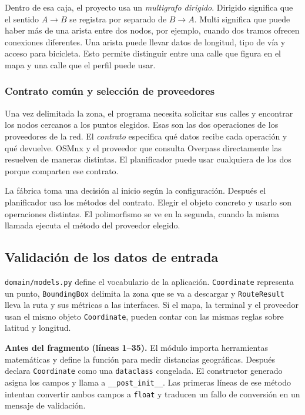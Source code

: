 \documentclass[11pt,a4paper]{article}
\begin{document}
Dentro de esa caja, el proyecto usa un \emph{multigrafo dirigido}. Dirigido significa que el sentido \(A\to B\) se registra por separado de \(B\to A\). Multi significa que puede haber más de una arista entre dos nodos, por ejemplo, cuando dos tramos ofrecen conexiones diferentes. Una arista puede llevar datos de longitud, tipo de vía y acceso para bicicleta. Esto permite distinguir entre una calle que figura en el mapa y una calle que el perfil puede usar.

\subsubsection{Contrato común y selección de proveedores}
Una vez delimitada la zona, el programa necesita solicitar sus calles y encontrar los nodos cercanos a los puntos elegidos. Esas son las dos operaciones de los proveedores de la red. El \emph{contrato} especifica qué datos recibe cada operación y qué devuelve. OSMnx y el proveedor que consulta Overpass directamente las resuelven de maneras distintas. El planificador puede usar cualquiera de los dos porque comparten ese contrato.

La fábrica toma una decisión al inicio según la configuración. Después el planificador usa los métodos del contrato. Elegir el objeto concreto y usarlo son operaciones distintas. El polimorfismo se ve en la segunda, cuando la misma llamada ejecuta el método del proveedor elegido.

\subsection{Validación de los datos de entrada}

\texttt{domain/models.py} define el vocabulario de la aplicación. \texttt{Coordinate} representa un punto, \texttt{BoundingBox} delimita la zona que se va a descargar y \texttt{RouteResult} lleva la ruta y sus métricas a las interfaces. Si el mapa, la terminal y el proveedor usan el mismo objeto \texttt{Coordinate}, pueden contar con las mismas reglas sobre latitud y longitud.

\textbf{Antes del fragmento (líneas 1--35).} El módulo importa herramientas matemáticas y define la función para medir distancias geográficas. Después declara \texttt{Coordinate} como una \texttt{dataclass} congelada. El constructor generado asigna los campos y llama a \texttt{\_\_post\_init\_\_}. Las primeras líneas de ese método intentan convertir ambos campos a \texttt{float} y traducen un fallo de conversión en un mensaje de validación.
\end{document}
